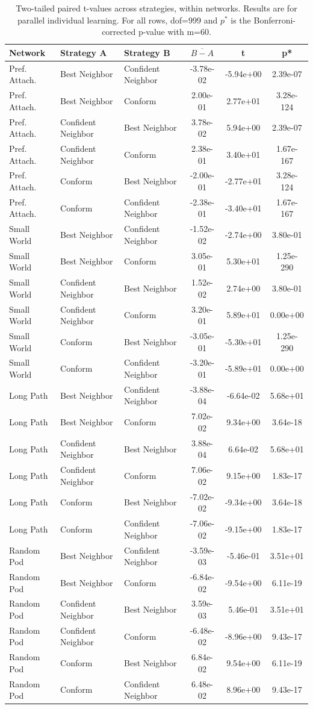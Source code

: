 \begin{table}[]
    \centering
    \begin{tabular}{l|ll|ccc}
        Network & Strategy A & Strategy B & $\overline{B - A}$ & t & p* \\
    \hline
Pref. Attach.&Best Neighbor&Confident Neighbor&-3.78e-02&-5.94e+00&2.39e-07\\
Pref. Attach.&Best Neighbor&Conform&2.00e-01&2.77e+01&3.28e-124\\
Pref. Attach.&Confident Neighbor&Best Neighbor&3.78e-02&5.94e+00&2.39e-07\\
Pref. Attach.&Confident Neighbor&Conform&2.38e-01&3.40e+01&1.67e-167\\
Pref. Attach.&Conform&Best Neighbor&-2.00e-01&-2.77e+01&3.28e-124\\
Pref. Attach.&Conform&Confident Neighbor&-2.38e-01&-3.40e+01&1.67e-167\\
\hline
Small World&Best Neighbor&Confident Neighbor&-1.52e-02&-2.74e+00&3.80e-01\\
Small World&Best Neighbor&Conform&3.05e-01&5.30e+01&1.25e-290\\
Small World&Confident Neighbor&Best Neighbor&1.52e-02&2.74e+00&3.80e-01\\
Small World&Confident Neighbor&Conform&3.20e-01&5.89e+01&0.00e+00\\
Small World&Conform&Best Neighbor&-3.05e-01&-5.30e+01&1.25e-290\\
Small World&Conform&Confident Neighbor&-3.20e-01&-5.89e+01&0.00e+00\\
\hline
Long Path&Best Neighbor&Confident Neighbor&-3.88e-04&-6.64e-02&5.68e+01\\
Long Path&Best Neighbor&Conform&7.02e-02&9.34e+00&3.64e-18\\
Long Path&Confident Neighbor&Best Neighbor&3.88e-04&6.64e-02&5.68e+01\\
Long Path&Confident Neighbor&Conform&7.06e-02&9.15e+00&1.83e-17\\
Long Path&Conform&Best Neighbor&-7.02e-02&-9.34e+00&3.64e-18\\
Long Path&Conform&Confident Neighbor&-7.06e-02&-9.15e+00&1.83e-17\\
\hline
Random Pod&Best Neighbor&Confident Neighbor&-3.59e-03&-5.46e-01&3.51e+01\\
Random Pod&Best Neighbor&Conform&-6.84e-02&-9.54e+00&6.11e-19\\
Random Pod&Confident Neighbor&Best Neighbor&3.59e-03&5.46e-01&3.51e+01\\
Random Pod&Confident Neighbor&Conform&-6.48e-02&-8.96e+00&9.43e-17\\
Random Pod&Conform&Best Neighbor&6.84e-02&9.54e+00&6.11e-19\\
Random Pod&Conform&Confident Neighbor&6.48e-02&8.96e+00&9.43e-17\\
    \hline
    \end{tabular}
    \caption{Two-tailed paired t-values across strategies, within networks. Results are for parallel individual learning. For all rows, dof=999 and $p^*$ is the Bonferroni-corrected p-value with m=60.}
    \label{tab:t-innet-parallel}
\end{table}


